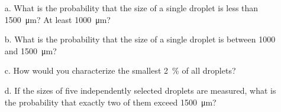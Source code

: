 \documentclass[letterpaper,12pt]{article}
\begin{document}
\begin{enumerate}
    \begin{enumerate}
      \item[a.]
        What is the probability that the size of a single droplet is less than \qty{1500}{\micro\meter}? At least \qty{1000}{\micro\meter}?
      \item[b.]
        What is the probability that the size of a single droplet is between 1000 and \qty{1500}{\micro\meter}?
      \item[c.]
        How would you characterize the smallest \qty{2}{\percent} of all droplets?
      \item[d.]
        If the sizes of five independently selected droplets are measured, what is the probability that exactly two of them exceed \qty{1500}{\micro\meter}?
    \end{enumerate}
\end{enumerate}
\end{document}
